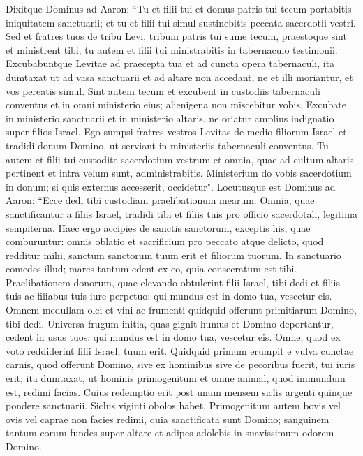 \begin{biblechapter}  
\verse Dixitque Dominus ad Aaron: “Tu et filii tui et domus patris tui tecum portabitis iniquitatem sanctuarii; et tu et filii tui simul sustinebitis peccata sacerdotii vestri. 
\verse Sed et fratres tuos de tribu Levi, tribum patris tui sume tecum, praestoque sint et ministrent tibi; tu autem et filii tui ministrabitis in tabernaculo testimonii. 
\verse Excubabuntque Levitae ad praecepta tua et ad cuncta opera tabernaculi, ita dumtaxat ut ad vasa sanctuarii et ad altare non accedant, ne et illi moriantur, et vos pereatis simul. 
\verse Sint autem tecum et excubent in custodiis tabernaculi conventus et in omni ministerio eius; alienigena non miscebitur vobis. 
\verse Excubate in ministerio sanctuarii et in ministerio altaris, ne oriatur amplius indignatio super filios Israel. 
\verse Ego sumpsi fratres vestros Levitas de medio filiorum Israel et tradidi donum Domino, ut serviant in ministeriis tabernaculi conventus. 
\verse Tu autem et filii tui custodite sacerdotium vestrum et omnia, quae ad cultum altaris pertinent et intra velum sunt, administrabitis. Ministerium do vobis sacerdotium in donum; si quis externus accesserit, occidetur". 
\verse Locutusque est Dominus ad Aaron: “Ecce dedi tibi custodiam praelibationum mearum. Omnia, quae sanctificantur a filiis Israel, tradidi tibi et filiis tuis pro officio sacerdotali, legitima sempiterna. 
\verse Haec ergo accipies de sanctis sanctorum, exceptis his, quae comburuntur: omnis oblatio et sacrificium pro peccato atque delicto, quod redditur mihi, sanctum sanctorum tuum erit et filiorum tuorum. 
\verse In sanctuario comedes illud; mares tantum edent ex eo, quia consecratum est tibi. 
\verse Praelibationem donorum, quae elevando obtulerint filii Israel, tibi dedi et filiis tuis ac filiabus tuis iure perpetuo: qui mundus est in domo tua, vescetur eis. 
\verse Omnem medullam olei et vini ac frumenti quidquid offerunt primitiarum Domino, tibi dedi. 
\verse Universa frugum initia, quas gignit humus et Domino deportantur, cedent in usus tuos: qui mundus est in domo tua, vescetur eis. 
\verse Omne, quod ex voto reddiderint filii Israel, tuum erit. 
\verse Quidquid primum erumpit e vulva cunctae carnis, quod offerunt Domino, sive ex hominibus sive de pecoribus fuerit, tui iuris erit; ita dumtaxat, ut hominis primogenitum et omne animal, quod immundum est, redimi facias. 
\verse Cuius redemptio erit post unum mensem siclis argenti quinque pondere sanctuarii. Siclus viginti obolos habet. 
\verse Primogenitum autem bovis vel ovis vel caprae non facies redimi, quia sanctificata sunt Domino; sanguinem tantum eorum fundes super altare et adipes adolebis in suavissimum odorem Domino. 

\end{biblechapter}

